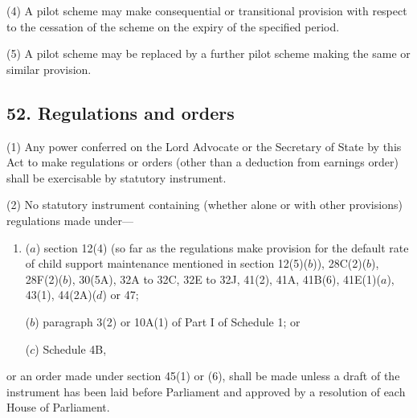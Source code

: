 \documentclass[a4paper]{article}
\begin{document}
(4)
A pilot scheme may make consequential or transitional provision with respect to the cessation of the scheme on the expiry of the specified period.

(5)
A pilot scheme may be replaced by a further pilot scheme making the same or similar provision.


\subsection{52. Regulations and orders}

(1) Any power conferred on the Lord Advocate or the Secretary of State by this Act to make regulations or orders (other than a deduction from earnings order) shall be exercisable by statutory instrument.


(2) No statutory instrument containing (whether alone or with other provisions) regulations made under---
\begin{enumerate}\item[]
($a$) section 12(4) (so far as the regulations make provision for the default
rate of child support maintenance mentioned in section 12(5)($b$)), 28C(2)($b$),
28F(2)($b$), 30(5A), 32A to 32C, 32E to 32J, 41(2), 41A, 41B(6), 41E(1)($a$), 43(1), 44(2A)($d$) or
47;

($b$) paragraph 3(2) or 10A(1) of Part I of Schedule 1; or

($c$) Schedule 4B, 
\end{enumerate}
or an order made under section 45(1) or (6), shall be made unless a draft of the
instrument has been laid before Parliament and approved by a resolution of each House of Parliament.
\end{document}
